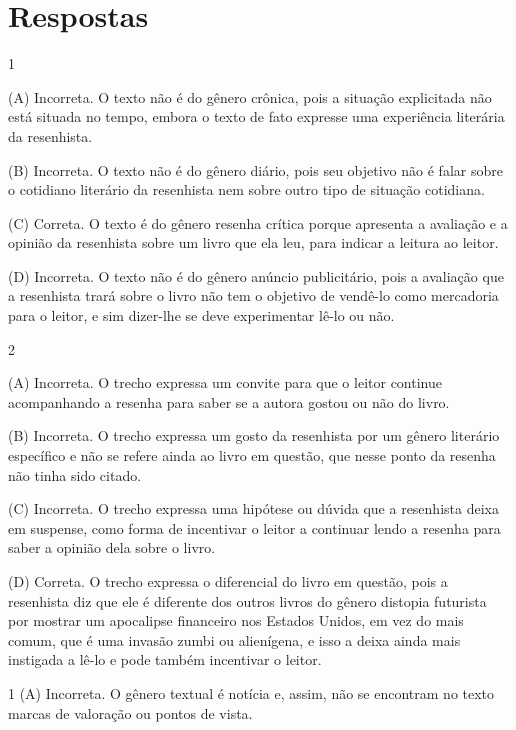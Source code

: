 \chapter{Respostas}
\pagestyle{plain}
\footnotesize

\pagecolor{gray!40}


\num{1}

(A) Incorreta. O texto não é do gênero crônica, pois a situação
explicitada não está situada no tempo, embora o texto de fato expresse
uma experiência literária da resenhista. 

(B) Incorreta. O texto não é do
gênero diário, pois seu objetivo não é falar sobre o cotidiano literário
da resenhista nem sobre outro tipo de situação cotidiana. 

(C) Correta. O
texto é do gênero resenha crítica porque apresenta a avaliação e a
opinião da resenhista sobre um livro que ela leu, para indicar a leitura
ao leitor. 

(D) Incorreta. O texto não é do gênero anúncio publicitário,
pois a avaliação que a resenhista trará sobre o livro não tem o objetivo
de vendê-lo como mercadoria para o leitor, e sim dizer-lhe se deve
experimentar lê-lo ou não.

\num{2}

(A) Incorreta. O trecho expressa um convite para que o leitor continue
acompanhando a resenha para saber se a autora gostou ou não do livro.

(B) Incorreta. O trecho expressa um gosto da resenhista por um gênero
literário específico e não se refere ainda ao livro em questão, que
nesse ponto da resenha não tinha sido citado. 

(C) Incorreta. O trecho
expressa uma hipótese ou dúvida que a resenhista deixa em suspense, como
forma de incentivar o leitor a continuar lendo a resenha para saber a
opinião dela sobre o livro. 

(D) Correta. O trecho expressa o diferencial
do livro em questão, pois a resenhista diz que ele é diferente dos
outros livros do gênero distopia futurista por mostrar um apocalipse
financeiro nos Estados Unidos, em vez do mais comum, que é uma invasão
zumbi ou alienígena, e isso a deixa ainda mais instigada a lê-lo e pode
também incentivar o leitor.


\num{1}
(A) Incorreta. O gênero textual é notícia e, assim, não se encontram no
texto marcas de valoração ou pontos de vista. 

